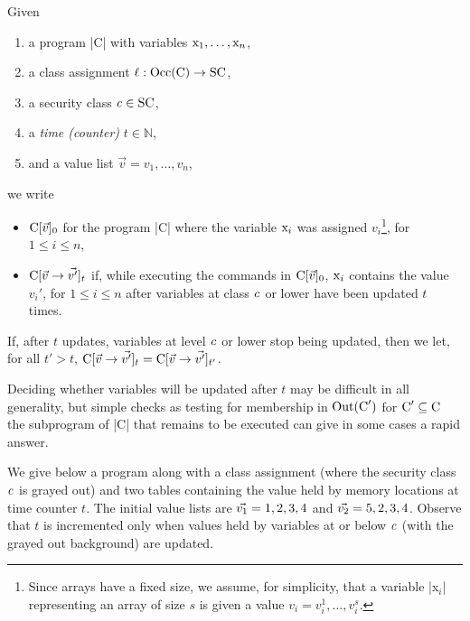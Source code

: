 \begin{definition}
Given
\begin{enumerate}
\item a program \prc|C| with variables \(\prc|x|_1, \hdots, \prc|x|_n\),
\item a class assignment \(\ell : \Occ(\prc|C|) \to \SC\),
\item a security class \(\mathit{c} \in \mathrm{SC}\),
\item a \emph{time (counter)} \(t \in \mathbb{N}\),
\item and a value list \(\vec{v} = v_1, \hdots, v_n\),
\end{enumerate}
we write
\begin{itemize}

\item \(\prc|C|[\vec{v}]_0\) for the program \prc|C| where the variable
\(\prc|x$_i$|\) was assigned \(v_i\)\footnote{Since arrays have a fixed size, we
assume, for simplicity, that a variable \prc|x$_i$| representing an array of
size $s$ is given a value $v_i = v_i^1, \hdots, v_i^s$.}, for \(1 \leqslant i
\leqslant n\),

\item  \(\prc|C|[\vec{v} \rightarrow \vec{v'}]_t\) if, while executing the
commands in \(\prc|C|[\vec{v}]_0\), \(\prc|x$_i$|\) contains the value \(v_i'\),
for \(1 \leqslant i \leqslant n\) after variables at class \(\mathit{c}\) or lower
have been updated \(t\) times.

\end{itemize}
If, after \(t\) updates, variables at level \(\mathit{c}\) or lower stop being
updated, then we let, for all \(t' > t\), \(\prc|C|[\vec{v} \rightarrow
\vec{v'}]_t = \prc|C|[\vec{v} \rightarrow \vec{v'}]_{t'}\).
\end{definition}

Deciding whether variables will be updated after \(t\) may be difficult in all
generality, but simple checks as \eg testing for membership in
\(\Out(\prc|C|')\) for \(\prc|C|' \subseteq \prc|C|\) the subprogram of \prc|C|
that remains to be executed can give in some cases a rapid answer.

We give below a program along with a class assignment (where the security class
\(\mathit{c}\) is grayed out) and two tables containing the value held by memory
locations at time counter \(t\). The initial value lists are \(\vec{v_1} =
\prc|1|, \prc|2|, \prc|3|, \prc|4|\) and \(\vec{v_2} = \prc|5|, \prc|2|,
\prc|3|, \prc|4|\). Observe that \(t\) is incremented only when values held by
variables at or below \(\mathit{c}\) (with the grayed out background) are updated.

